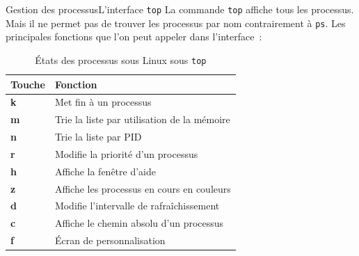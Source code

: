 \documentclass{beamer}
\begin{document}
    \begin{frame}{Gestion des processus}{L'interface \lstinline{top}}
        La commande \lstinline{top} affiche tous les processus.
        Mais il ne permet pas de trouver les processus par nom contrairement à \lstinline{ps}.
        \bigbreak
        Les principales fonctions que l'on peut appeler dans l'interface~:
        \begin{table}[h!]
            \centering
            \begin{tabular}{|p{}|p{}|}
                \hline
                \textbf{Touche} & \textbf{Fonction}                           \\ \hline
                \textbf{k}      & Met fin à un processus                      \\ \hline
                \textbf{m}      & Trie la liste par utilisation de la mémoire \\ \hline
                \textbf{n}      & Trie la liste par PID                       \\ \hline
                \textbf{r}      & Modifie la priorité d’un processus          \\ \hline
                \textbf{h}      & Affiche la fenêtre d’aide                   \\ \hline
                \textbf{z}      & Affiche les processus en cours en couleurs  \\ \hline
                \textbf{d}      & Modifie l’intervalle de rafraîchissement    \\ \hline
                \textbf{c}      & Affiche le chemin absolu d’un processus     \\ \hline
                \textbf{f}      & Écran de personnalisation                   \\ \hline
            \end{tabular}
            \caption{États des processus sous Linux sous \lstinline{top}}
        \end{table}
    \end{frame}
\end{document}
